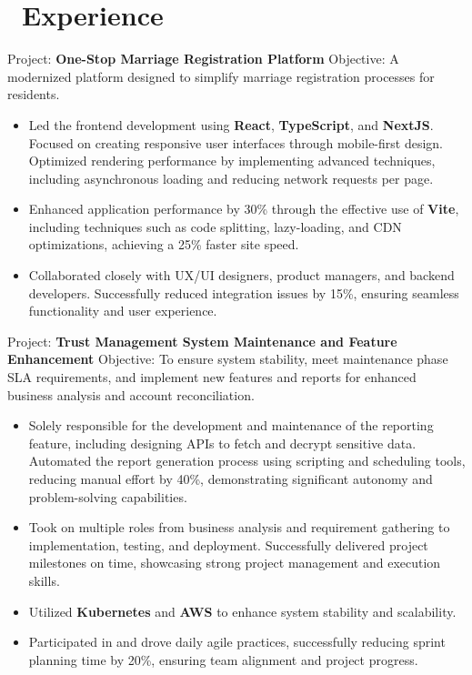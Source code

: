 \documentclass{resume}
\begin{document}
\onehalfspacing
{}



\section{\faUsers\ Experience}
\role{Software Developer}

Project: \textbf{One-Stop Marriage Registration Platform}
Objective: A modernized platform designed to simplify marriage registration processes for residents.
\begin{itemize}
  \item Led the frontend development using \textbf{React}, \textbf{TypeScript}, and \textbf{NextJS}. Focused on creating responsive user interfaces through mobile-first design. Optimized rendering performance by implementing advanced techniques, including asynchronous loading and reducing network requests per page.
  \item Enhanced application performance by 30\% through the effective use of \textbf{Vite}, including techniques such as code splitting, lazy-loading, and CDN optimizations, achieving a 25\% faster site speed.
  \item Collaborated closely with UX/UI designers, product managers, and backend developers. Successfully reduced integration issues by 15\%, ensuring seamless functionality and user experience.
\end{itemize}

Project: \textbf{Trust Management System Maintenance and Feature Enhancement}
Objective: To ensure system stability, meet maintenance phase SLA requirements, and implement new features and reports for enhanced business analysis and account reconciliation.
\begin{itemize}
  \item Solely responsible for the development and maintenance of the reporting feature, including designing APIs to fetch and decrypt sensitive data. Automated the report generation process using scripting and scheduling tools, reducing manual effort by 40\%, demonstrating significant autonomy and problem-solving capabilities.
  \item Took on multiple roles from business analysis and requirement gathering to implementation, testing, and deployment. Successfully delivered project milestones on time, showcasing strong project management and execution skills.
  \item Utilized \textbf{Kubernetes} and \textbf{AWS} to enhance system stability and scalability.
  \item Participated in and drove daily agile practices, successfully reducing sprint planning time by 20\%, ensuring team alignment and project progress.
\end{itemize}
\end{document}
